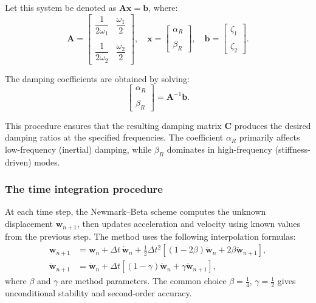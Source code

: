 \documentclass{article}
\begin{document}
	Let this system be denoted as \( \mathbf{A} \boldsymbol{x} = \boldsymbol{b} \), where:
	\[
	\mathbf{A} =
	\begin{bmatrix}
		\dfrac{1}{2\omega_1} & \dfrac{\omega_1}{2} \\\\
		\dfrac{1}{2\omega_2} & \dfrac{\omega_2}{2}
	\end{bmatrix},
	\quad
	\boldsymbol{x} =
	\begin{bmatrix}
		\alpha_R \\\\
		\beta_R
	\end{bmatrix},
	\quad
	\boldsymbol{b} =
	\begin{bmatrix}
		\zeta_1 \\\\
		\zeta_2
	\end{bmatrix}.
	\]
	
	The damping coefficients are obtained by solving:
	\begin{equation}
		\begin{bmatrix}
			\alpha_R \\\\
			\beta_R
		\end{bmatrix}
		=
		\mathbf{A}^{-1} \boldsymbol{b}.
	\end{equation}
	
	This procedure ensures that the resulting damping matrix \( \mathbf{C} \) produces the desired damping ratios at the specified frequencies. The coefficient \( \alpha_R \) primarily affects low-frequency (inertial) damping, while \( \beta_R \) dominates in high-frequency (stiffness-driven) modes.
	
	
\subsubsection{The time integration procedure}
	At each time step, the Newmark--Beta scheme computes the unknown displacement \( \mathit{\mathbf{w}}_{n+1} \), then updates acceleration and velocity using known values from the previous step. The method uses the following interpolation formulas:
	\begin{align}
		\mathit{\mathbf{w}}_{n+1} &= \mathit{\mathbf{w}}_n + \Delta t\, \dot{\mathit{\mathbf{w}}}_n + \frac{1}{2} \Delta t^2 \left[ (1 - 2\beta) \ddot{\mathit{\mathbf{w}}}_n + 2\beta \ddot{\mathit{\mathbf{w}}}_{n+1} \right], \\
		\dot{\mathit{\mathbf{w}}}_{n+1} &= \dot{\mathit{\mathbf{w}}}_n + \Delta t \left[ (1 - \gamma) \ddot{\mathit{\mathbf{w}}}_n + \gamma \ddot{\mathit{\mathbf{w}}}_{n+1} \right],
	\end{align}
	where \( \beta \) and \( \gamma \) are method parameters. The common choice \( \beta = \tfrac{1}{4} \), \( \gamma = \tfrac{1}{2} \) gives unconditional stability and second-order accuracy.
	
\end{document}
